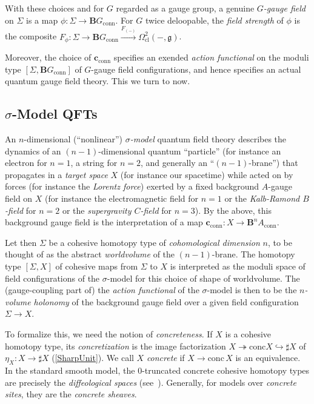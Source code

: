 \documentclass[copyright,12pt]{eptcs}
\begin{document}
With these choices and
for $G$ regarded as a gauge group, a genuine \emph{$G$-gauge field} on $\Sigma$ is a map
$\phi : \Sigma \to \mathbf{B}G_{\mathrm{conn}}$. For $G$ twice deloopable, the \emph{field strength}
of $\phi$ is the
composite
$F_{\phi} : \Sigma \to \mathbf{B}G_{\mathrm{conn}} \xrightarrow{F_{(-)}} \Omega^2_{\mathrm{cl}}(-,\mathfrak{g})$.

Moreover, the choice of $\mathbf{c}_{\mathrm{conn}}$ specifies an exended \emph{action functional}
on the moduli type $[\Sigma, \mathbf{B}G_{\mathrm{conn}}]$ of $G$-gauge field configurations, and hence
specifies an actual quantum gauge field theory. This we turn to now.


\subsection{$\sigma$-Model QFTs}


An $n$-dimensional (``nonlinear'')
\emph{$\sigma$-model} quantum field theory describes the dynamics of an $(n-1)$-dimensional
quantum ``particle'' (for instance an electron for $n = 1$, a string  for $n = 2$, and generally
an ``$(n-1)$-brane'') that propagates in a \emph{target space} $X$
(for instance our spacetime) while acted on by forces (for instance the \emph{Lorentz force})
exerted by a fixed background $A$-gauge field on $X$
(for instance the electromagnetic field for $n = 1$ or the \emph{Kalb-Ramond $B$-field} for $n = 2$
or the \emph{supergravity $C$-field} for $n = 3$).
By the above, this background gauge field is the interpretation of a map
$
  \mathbf{c}_{\mathrm{conn}}
    : X \to  \mathbf{B}^n A_{\mathrm{conn}}
$.

Let then $\Sigma$ be a cohesive homotopy type of \emph{cohomological dimension} $n$,
to be thought of as the abstract \emph{worldvolume} of the $(n-1)$-brane.
The homotopy type $[\Sigma,X]$ of cohesive
maps from $\Sigma$ to $X$ is interpreted as the moduli space of field configurations of the
$\sigma$-model for this choice of shape of worldvolume.
The (gauge-coupling part of) the \emph{action functional} of the $\sigma$-model is
then to be the \emph{$n$-volume holonomy} of the background gauge field over a given
field configuration $\Sigma \to X$.

To formalize this, we need the notion of \emph{concreteness}.
If $X$ is a cohesive homotopy type, its \emph{concretization} is the image factorization
$X \twoheadrightarrow \mathrm{conc} X \hookrightarrow \sharp X$
of $\eta_X:X\to \sharp X$ (\ref{SharpUnit}).
We call $X$ \emph{concrete} if $X \to \mathrm{conc}\,X$ is an equivalence.
In the standard smooth model, the 0-truncated concrete
cohesive homotopy types are precisely the \emph{diffeological spaces} (see~\cite{SmoothSpaces}).
Generally, for models over \emph{concrete sites}, they are the \emph{concrete sheaves}.
\end{document}
